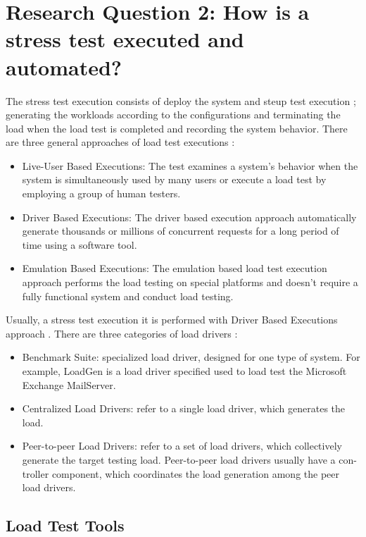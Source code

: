 \section{Research Question 2: How is a stress test executed and automated?}


The stress test execution  consists of deploy the system  and steup test execution ; generating the workloads according to the configurations and terminating the load when the load test is completed and recording the system behavior. There are three general approaches of load test executions \cite{Molyneaux2009}\cite{Jiang2010}:

\begin{itemize}
\item Live-User Based Executions: The test examines a system’s behavior when the system is simultaneously used by many users or execute a load test by employing a group of human testers. 
\item Driver Based Executions: The driver based execution approach automatically generate thousands or millions of concurrent requests for a long period of time using a software tool.
\item Emulation Based Executions: The emulation based load test execution approach performs the load testing on special platforms and doesn't require a fully functional system and conduct load testing.
\end{itemize}

Usually, a stress test execution it is performed with Driver Based Executions approach \cite{Erinle2013} \cite{MohammadS.Obaidat} \cite{Wang2013}. There are three categories of load drivers \cite{Jiang2010}: 

\begin{itemize}
\item Benchmark Suite: specialized load driver, designed for one type of system. For example, LoadGen is a load driver specified used to load test the Microsoft Exchange MailServer.
\item  Centralized Load Drivers: refer to a single load driver, which generates the load.
\item Peer-to-peer Load Drivers: refer to a set of load drivers, which collectively generate the target testing load. Peer-to-peer load drivers usually have a con- troller component, which coordinates the load generation among the peer load drivers. 
\end{itemize}


\subsection{Load Test Tools}


